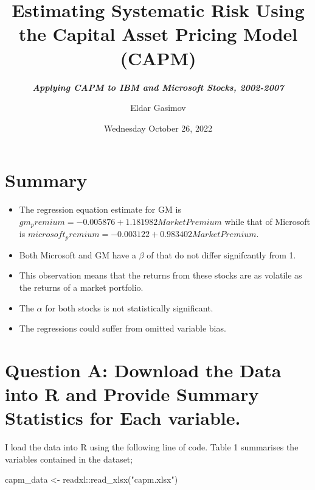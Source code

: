 \documentclass[
]{article}
\title{\textbf{Estimating Systematic Risk Using the Capital Asset
Pricing Model (CAPM)}}
\subtitle{\textbf{\emph{Applying CAPM to IBM and Microsoft Stocks,
2002-2007}}}
\author{Eldar Gasimov}
\date{Wednesday October 26, 2022}
\newenvironment{Shaded}{\begin{snugshade}}{\end{snugshade}}
\newcommand{\FunctionTok}[1]{\textcolor[rgb]{0.00,0.00,0.00}{#1}}
\newcommand{\NormalTok}[1]{#1}
\newcommand{\OtherTok}[1]{\textcolor[rgb]{0.56,0.35,0.01}{#1}}
\newcommand{\SpecialCharTok}[1]{\textcolor[rgb]{0.00,0.00,0.00}{#1}}
\newcommand{\StringTok}[1]{\textcolor[rgb]{0.31,0.60,0.02}{#1}}
\providecommand{\tightlist}{%
  \setlength{\itemsep}{0pt}\setlength{\parskip}{0pt}}
\begin{document}
\maketitle

{
\setcounter{tocdepth}{3}
\tableofcontents
}
\newpage

\hypertarget{summary}{%
\section{Summary}\label{summary}}

\begin{itemize}
\tightlist
\item
  The regression equation estimate for GM is
  \(gm_premium = -0.005876 + 1.181982Market Premium\) while that of
  Microsoft is
  \(microsoft_premium = -0.003122 + 0.983402Market Premium\).
\item
  Both Microsoft and GM have a \(\beta\) of that do not differ
  signifcantly from 1.
\item
  This observation means that the returns from these stocks are as
  volatile as the returns of a market portfolio.
\item
  The \(\alpha\) for both stocks is not statistically significant.
\item
  The regressions could suffer from omitted variable bias.
\end{itemize}

\hypertarget{question-a-download-the-data-into-r-and-provide-summary-statistics-for-each-variable.}{%
\section{\texorpdfstring{\textbf{Question A: Download the Data into R
and Provide Summary Statistics for Each
variable.}}{Question A: Download the Data into R and Provide Summary Statistics for Each variable.}}\label{question-a-download-the-data-into-r-and-provide-summary-statistics-for-each-variable.}}

I load the data into R using the following line of code. Table 1
summarises the variables contained in the dataset;

\begin{Shaded}
\begin{Highlighting}[]
\NormalTok{capm\_data }\OtherTok{\textless{}{-}}\NormalTok{ readxl}\SpecialCharTok{::}\FunctionTok{read\_xlsx}\NormalTok{(}\StringTok{"capm.xlsx"}\NormalTok{) }
\end{Highlighting}
\end{Shaded}
\end{document}
